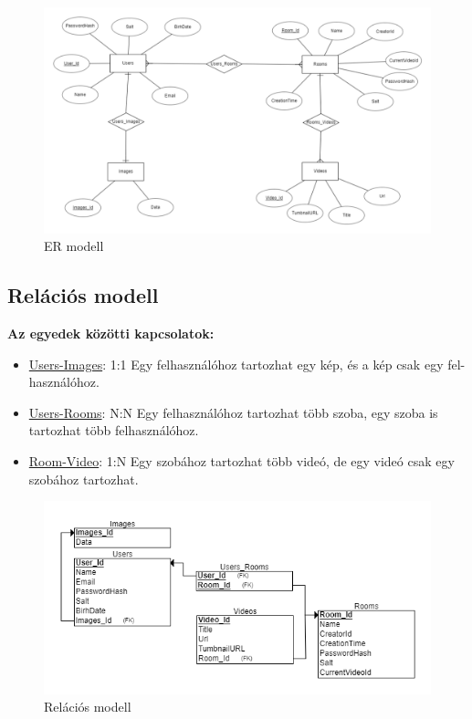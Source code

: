 \begin{figure}[H]
    \centering
    \includegraphics[width=15.0truecm]{images/er_modell.png}
    \caption{ER modell}
    \label{fig:er_modell}
\end{figure}

\subsection*{Relációs modell}
\textbf{Az egyedek közötti kapcsolatok:}
\begin{itemize}
    \item \underline{Users-Images}: 1:1 Egy felhasználóhoz tartozhat egy kép, és a kép csak egy fel-
          használóhoz.
    \item \underline{Users-Rooms}: N:N Egy felhasználóhoz tartozhat több szoba, egy szoba is tartozhat
          több felhasználóhoz.
    \item \underline{Room-Video}: 1:N Egy szobához tartozhat több videó, de egy videó csak egy
          szobához tartozhat.
\end{itemize}

\begin{figure}[H]
    \centering
    \includegraphics[width=15.0truecm]{images/relation_modell.png}
    \caption{Relációs modell}
    \label{fig:relation_modell}
\end{figure}

